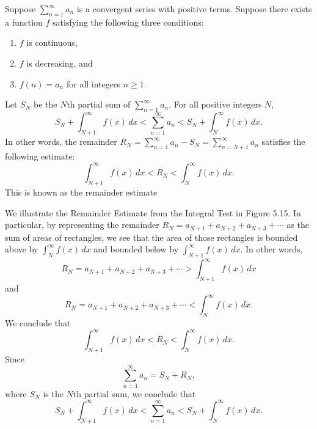 \documentclass{report}
\begin{document}
    \bigbreak \noindent 
    \begin{thrm}
        Suppose \( \sum_{n=1}^{\infty} a_n \)
        is a convergent series with positive terms. Suppose there exists a function \( f \)
        satisfying the following three conditions:
        \begin{enumerate}
            \item \( f \) is continuous,
            \item \( f \) is decreasing, and
            \item \( f(n) = a_n \) for all integers \( n \geq 1 \).
        \end{enumerate}
        Let \( S_N \) be the \( N \)th partial sum of \( \sum_{n=1}^{\infty} a_n \).
        For all positive integers \( N \),
        \[
        S_N + \int_{N+1}^{\infty} f(x) \, dx < \sum_{n=1}^{\infty} a_n < S_N + \int_{N}^{\infty} f(x) \, dx.
        \]
        In other words, the remainder \( R_N = \sum_{n=1}^{\infty} a_n - S_N = \sum_{n=N+1}^{\infty} a_n \)
        satisfies the following estimate:
        \[
        \int_{N+1}^{\infty} f(x) \, dx < R_N < \int_{N}^{\infty} f(x) \, dx.
        \]
        This is known as the remainder estimate 
    \end{thrm}
    \bigbreak \noindent 
    We illustrate the Remainder Estimate from the Integral Test in Figure 5.15. In particular, by representing the remainder \( R_N = a_{N+1} + a_{N+2} + a_{N+3} + \cdots \)
    as the sum of areas of rectangles, we see that the area of those rectangles is bounded above by \( \int_{N}^{\infty} f(x) \, dx \)
    and bounded below by \( \int_{N+1}^{\infty} f(x) \, dx \).
    In other words,
    \[
    R_N = a_{N+1} + a_{N+2} + a_{N+3} + \cdots > \int_{N+1}^{\infty} f(x) \, dx
    \]
    and
    \[
    R_N = a_{N+1} + a_{N+2} + a_{N+3} + \cdots < \int_{N}^{\infty} f(x) \, dx.
    \]
    We conclude that
    \[
    \int_{N+1}^{\infty} f(x) \, dx < R_N < \int_{N}^{\infty} f(x) \, dx.
    \]
    Since
    \[
    \sum_{n=1}^{\infty} a_n = S_N + R_N,
    \]
    where \( S_N \)
    is the \( N \)th partial sum, we conclude that
    \[
    S_N + \int_{N+1}^{\infty} f(x) \, dx < \sum_{n=1}^{\infty} a_n < S_N + \int_{N}^{\infty} f(x) \, dx.
    \]
\end{document}
